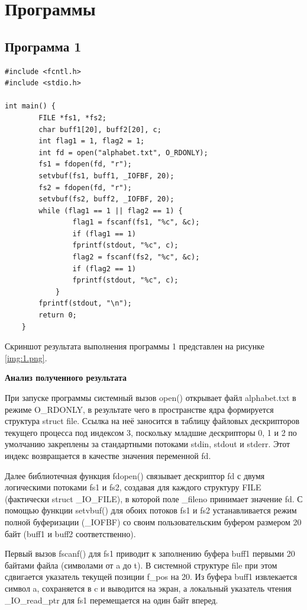 \section{Программы}
\subsection{Программа 1}
\begin{lstlisting}[caption={Исходный код Программы 1}]
#include <fcntl.h>
#include <stdio.h>

int main() {
		FILE *fs1, *fs2;
		char buff1[20], buff2[20], c;
		int flag1 = 1, flag2 = 1;
		int fd = open("alphabet.txt", O_RDONLY);
		fs1 = fdopen(fd, "r");
		setvbuf(fs1, buff1, _IOFBF, 20);
		fs2 = fdopen(fd, "r");
		setvbuf(fs2, buff2, _IOFBF, 20);
		while (flag1 == 1 || flag2 == 1) {
				flag1 = fscanf(fs1, "%c", &c);
				if (flag1 == 1)
				fprintf(stdout, "%c", c);
				flag2 = fscanf(fs2, "%c", &c);
				if (flag2 == 1)
				fprintf(stdout, "%c", c);
			}
		fprintf(stdout, "\n");
		return 0;
	}
\end{lstlisting}

Скриншот результата выполнения программы 1 представлен на рисунке \ref{img:1.png}.

\clearpage

\textbf{Анализ полученного результата}

При запуске программы системный вызов open() открывает файл alphabet.txt в режиме O\_RDONLY, в результате чего в пространстве ядра формируется структура struct file. Ссылка на неё заносится в таблицу файловых дескрипторов текущего процесса под индексом 3, поскольку младшие дескрипторы 0, 1 и 2 по умолчанию закреплены за стандартными потоками stdin, stdout и stderr. Этот индекс возвращается в качестве значения переменной fd.

Далее библиотечная функция fdopen() связывает дескриптор fd с двумя логическими потоками fs1 и fs2, создавая для каждого структуру FILE (фактически struct \_IO\_FILE), в которой поле \_fileno принимает значение fd. С помощью функции setvbuf() для обоих потоков fs1 и fs2 устанавливается режим полной буферизации (\_IOFBF) со своим пользовательским буфером размером 20 байт (buff1 и buff2 соответственно).

Первый вызов fscanf() для fs1 приводит к заполнению буфера buff1 первыми 20 байтами файла (символами от a до t). В системной структуре file при этом сдвигается указатель текущей позиции f\_pos на 20. Из буфера buff1 извлекается символ a, сохраняется в c и выводится на экран, а локальный указатель чтения \_IO\_read\_ptr для fs1 перемещается на один байт вперед.

